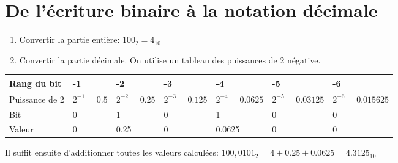 \begin{exercice_cours}{}

\end{exercice_cours}

\vspace{3.5cm}

\section{De l'écriture binaire à la notation décimale}

\begin{exemple}[Convertir $100,0101_2$]

\begin{enumerate}
	\item Convertir la partie entière: $100_2=4_{10}$
	\item Convertir la partie décimale. On utilise un tableau des puissances de 2 négative.
\end{enumerate}
	
\renewcommand{\arraystretch}{1.3}
\begin{footnotesize}
\begin{tabular}{|p{2.6cm}|p{1.8cm}|p{1.9cm}|p{2.2cm}|p{2.4cm}|p{2.5cm}|p{2.5cm}|}
\hline
Rang du bit & -1 & -2 & -3 & -4 & -5 & -6  \\ \hline
Puissance de 2 & $2^{-1}=0.5$ & $2^{-2}=0.25$ & $2^{-3}=0.125$ & $2^{-4}=0.0625$ & $2^{-5}=0.03125$ & $2^{-6}=0.015625$  \\ \hline
Bit & 0 & 1 & 0 & 1 & 0 & 0  \\ \hline
Valeur & 0 & 0.25  & 0  & 0.0625 & 0 & 0 \\ \hline

\end{tabular}
\end{footnotesize}


\medskip

Il suffit ensuite d'additionner toutes les valeurs calculées: $100,0101_2=4+0.25+0.0625=4.3125_{10}$

\end{exemple}

